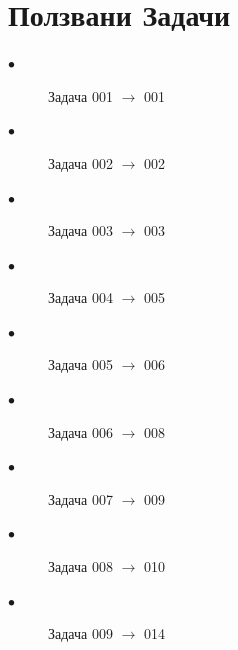 \documentclass[a4paper]{article}
\begin{document}
	
	
	\newpage
	\section*{Ползвани Задачи}
	\begin{description}
		\item[$\bullet$] Задача 001 $\rightarrow$ 001
		\item[$\bullet$] Задача 002 $\rightarrow$ 002
		\item[$\bullet$] Задача 003 $\rightarrow$ 003
		\item[$\bullet$] Задача 004 $\rightarrow$ 005
		\item[$\bullet$] Задача 005 $\rightarrow$ 006
		\item[$\bullet$] Задача 006 $\rightarrow$ 008
		\item[$\bullet$] Задача 007 $\rightarrow$ 009
		\item[$\bullet$] Задача 008 $\rightarrow$ 010
		\item[$\bullet$] Задача 009 $\rightarrow$ 014
	\end{description}
\end{document}

